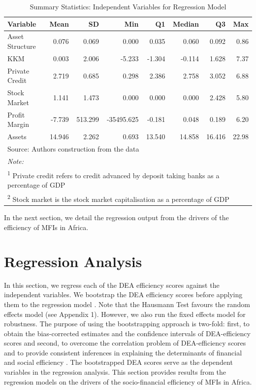 \documentclass[a4paper, nobind]{templates/ociamthesis}
\begin{document}
\begin{table}

\caption{\label{tab:unnamed-chunk-117}Summary Statistics: Independent Variables for Regression Model}
\centering
\fontsize{9}{11}\selectfont
\begin{tabular}[t]{lrrrrrrr}
\toprule
Variable & Mean & SD & Min & Q1 & Median & Q3 & Max\\
\midrule
Asset Structure & 0.076 & 0.069 & 0.000 & 0.035 & 0.060 & 0.092 & 0.86\\
KKM & 0.003 & 2.006 & -5.233 & -1.304 & -0.114 & 1.628 & 7.37\\
Private Credit & 2.719 & 0.685 & 0.298 & 2.386 & 2.758 & 3.052 & 6.88\\
Stock Market & 1.141 & 1.473 & 0.000 & 0.000 & 0.000 & 2.428 & 5.80\\
Profit Margin & -7.739 & 513.299 & -35495.625 & -0.181 & 0.048 & 0.189 & 6.20\\
\addlinespace
Assets & 14.946 & 2.262 & 0.693 & 13.540 & 14.858 & 16.416 & 22.98\\
\bottomrule
\multicolumn{8}{l}{\rule{0pt}{1em}Source: Authors construction from the data}\\
\multicolumn{8}{l}{\rule{0pt}{1em}\textit{Note: }}\\
\multicolumn{8}{l}{\rule{0pt}{1em}\textsuperscript{1} Private credit refers to credit advanced by deposit taking banks as a percentage of GDP}\\
\multicolumn{8}{l}{\rule{0pt}{1em}\textsuperscript{2} Stock market is the stock market capitalisation as a percentage of GDP}\\
\end{tabular}
\end{table}

In the next section, we detail the regression output from the drivers of the efficiency of MFIs in Africa.

\hypertarget{regression-analysis-1}{%
\section{Regression Analysis}\label{regression-analysis-1}}

In this section, we regress each of the DEA efficiency scores against the independent variables. We bootstrap the DEA efficiency scores before applying them to the regression model \autocite{simar2000general,tziogkidis2012bootstrap,fethi2010assessing}. Note that the Hausmann Test favours the random effects model (see Appendix 1). However, we also run the fixed effects model for robustness. The purpose of using the bootstrapping approach is two-fold: first, to obtain the bias-corrected estimates and the confidence intervals of DEA-efficiency scores and second, to overcome the correlation problem of DEA-efficiency scores and to provide consistent inferences in explaining the determinants of financial and social efficiency \autocite{assaf2010improving}. The bootstrapped DEA scores serve as the dependent variables in the regression analysis. This section provides results from the regression models on the drivers of the socio-financial efficiency of MFIs in Africa.
\end{document}
